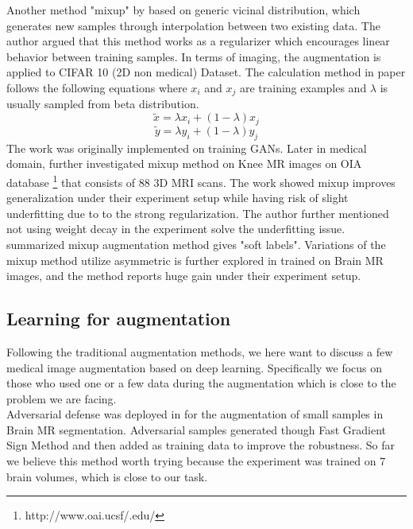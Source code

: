Another method "mixup" by \cite{zhang_mixup_2018} based on generic vicinal distribution, which generates new samples through interpolation between two existing data. The author argued that this method works as a regularizer which encourages linear behavior between training samples. In terms of imaging, the augmentation is applied to CIFAR 10 (2D non medical) Dataset. The calculation method in paper follows the following equations where $x_{i}$ and $x_{j}$ are training examples and $\lambda$ is usually sampled from beta distribution.
$$\tilde{x}=\lambda x_{i}+(1-\lambda) x_{j}$$
$$\tilde{y}=\lambda y_{i}+(1-\lambda) y_{j}$$
The work was originally implemented on training GANs. Later in medical domain, \cite{panfilov_improving_2019} further investigated mixup method on Knee MR images on OIA database \footnote{http://www.oai.ucsf/.edu/} that consists of 88 3D MRI scans. The work showed mixup improves generalization under their experiment setup while having risk of slight underfitting due to to the strong regularization. The author further mentioned not using weight decay in the experiment solve the underfitting issue.
\cite{tajbakhsh_embracing_2020} summarized mixup augmentation method gives "soft labels". Variations of the mixup method utilize asymmetric is further explored in \cite{li_overfitting_2019} trained on Brain MR images, and the method reports huge gain under their experiment setup.

\subsection{Learning for augmentation}
Following the traditional augmentation methods, we here want to discuss a few medical image augmentation based on deep learning. Specifically we focus on those who used one or a few data during the augmentation which is close to the problem we are facing.\\

Adversarial defense was deployed in \cite{suk_brain_2019} for the augmentation of small samples in Brain MR segmentation. Adversarial samples generated though Fast Gradient Sign Method\cite{goodfellow_explaining_2015} and then added as training data to improve the robustness. So far we believe this method worth trying because the experiment was trained on 7 brain volumes, which is close to our task.\\

